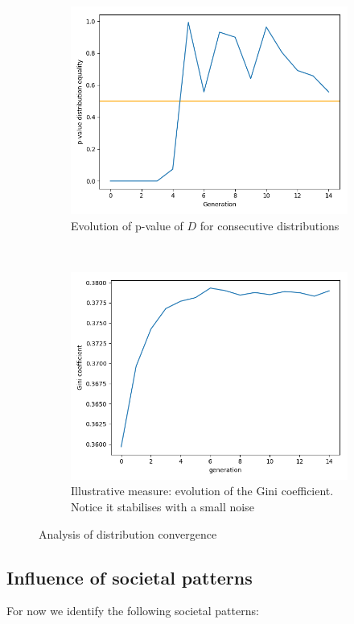 \begin{figure}
\begin{subfigure}{\textwidth}
  \centering
  \includegraphics[width=.8\linewidth]{Results/images/P-value_ks_stat201803111436.png}
  \caption{Evolution of p-value of $D$ for consecutive distributions}
  \label{fig:sfig1}
\end{subfigure}\\
\begin{subfigure}{\textwidth}
  \centering
  \includegraphics[width=.8\linewidth]{Results/images/gini_201803111436.png}
  \caption{Illustrative measure: evolution of the Gini coefficient. Notice it stabilises with a small noise}
  \label{fig:sfig2}
\end{subfigure}
\caption{Analysis of distribution convergence}
\label{fig:fig1}
\end{figure}

\subsection{Influence of societal patterns}
\label{sec:soc_pat}
For now we identify the following societal patterns:

